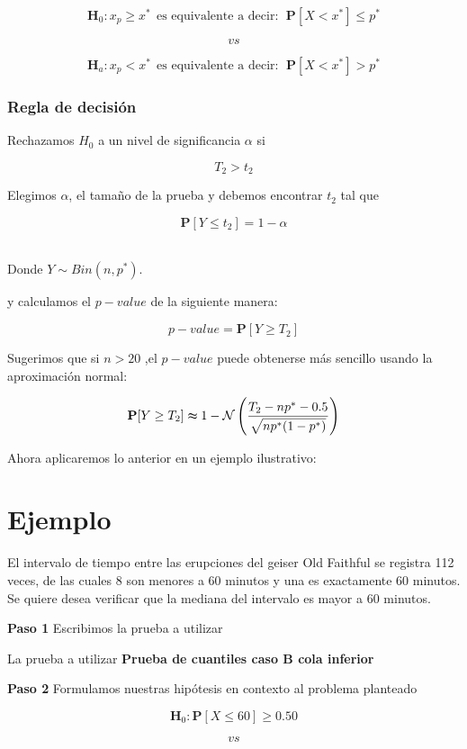 \documentclass[
  a4paper,
  oneside,
  openany]{book}
\begin{document}
\[\textbf{H}_0: x_{p} \geq x^* \ \ \mbox{es equivalente a decir}: \ \ \mathbf{P}[X < x^*]\leq p^*\]

\[vs\]

\[\textbf{H}_a: x_{p} < x^*  \ \ \mbox{es equivalente a decir}: \ \ \mathbf{P}[X < x^*]> p^*\]

\hypertarget{regla-de-decisiuxf3n-5}{%
\subsubsection*{Regla de decisión}\label{regla-de-decisiuxf3n-5}}


Rechazamos \(H_0\) a un nivel de significancia \(\alpha\) si

\[T_{2} > t_{2}\]

Elegimos \(\alpha\), el tamaño de la prueba y debemos encontrar \(t_{2}\) tal que

\[\mathbf{P}[Y \leq t_{2}]=1-\alpha\]~

Donde \(Y \sim Bin (n,p^*)\).

y calculamos el \(p-value\) de la siguiente manera:

\[p-value=\mathbf{P}[Y\geq T_{2}]\]

Sugerimos que si \(n > 20\) ,el \(p-value\) puede obtenerse más sencillo usando la aproximación normal:

\[\mathbf{P}[Y\geq T_{2}] \thickapprox 1- \mathcal{N} \left(\frac{T_{2}-np^*-0.5}{\sqrt{np^*(1-p^*)}}\right)\]

Ahora aplicaremos lo anterior en un ejemplo ilustrativo:

\hypertarget{ejemplo-1}{%
\section{Ejemplo}\label{ejemplo-1}}

El intervalo de tiempo entre las erupciones del geiser Old Faithful se registra 112 veces, de las cuales 8 son menores a 60 minutos y una es exactamente 60 minutos. Se quiere desea verificar que la mediana del intervalo es mayor a 60 minutos.

\textbf{Paso 1} Escribimos la prueba a utilizar

La prueba a utilizar \textbf{Prueba de cuantiles caso B cola inferior}

\textbf{Paso 2} Formulamos nuestras hipótesis en contexto al problema planteado

\[\textbf{H}_0: \mathbf{P}[X \leq 60]\geq 0.50\]

\[vs\]
\end{document}
